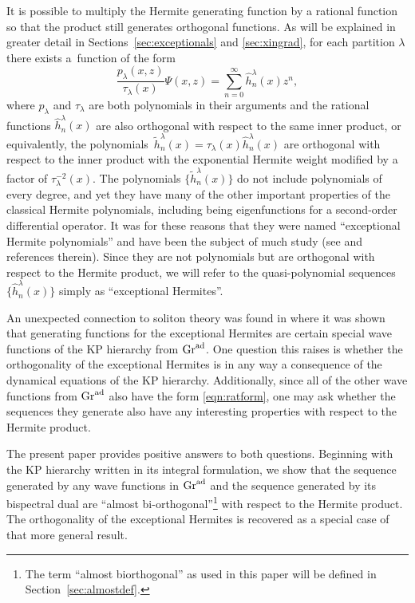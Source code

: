 \documentclass[pdftex]{sigma}
\numberwithin{equation}{section}
\theoremstyle{definition}
\begin{document}
 It is possible to multiply the Hermite generating function by a
 rational function so that the product still generates orthogonal functions.
As will be explained in greater detail in
Sections~\ref{sec:exceptionals} and \ref{sec:xingrad},
for each partition $\lambda$ there exists a~function of the form
 \begin{equation}
 \frac{p_{\lambda}(x,z)}{\tau_{\lambda}(x)}\Psi(x,z)=\sum_{n=0}^{\infty}\hat
 h_n^\lambda(x)z^n,\label{eqn:ratform}
\end{equation}
 where $p_{\lambda}$ and $\tau_{\lambda}$ are both polynomials in
 their arguments and the rational functions $\hat h_n^\lambda(x)$ are also
 orthogonal with respect to the same inner product, or equivalently, the polynomials~${\tilde h_n^\lambda(x)=\tau_{\lambda}(x)\hat h_n^{\lambda}(x)}$ are
 orthogonal with respect to the inner product with the exponential
 Hermite weight modified
 by a factor of $\tau_{\lambda}^{-2}(x)$.
The polynomials $\bigl\{\tilde h_n^\lambda(x)\bigr\}$ do not include
polynomials of every degree, and yet they have many of the other
important properties of the classical Hermite polynomials, including
being eigenfunctions for a second-order differential operator.
 It was
for these reasons that they were named ``exceptional Hermite
polynomials'' and have been the subject of much study (see
\cite{2014dry,XHermite1,XHermite2} and references therein). Since
they are not polynomials but are orthogonal with respect to the
Hermite product, we will refer to the quasi-polynomial sequences $\big\{\hat h_n^\lambda(x)\big\}$
simply as
``exceptional
 Hermites''.


An unexpected connection to soliton theory was found
in \cite{KasMil} where it was shown that generating functions
for the exceptional Hermites
are certain special wave functions of the KP hierarchy from ${\rm Gr}^{\rm ad}$.
One question this raises is whether the orthogonality of the
exceptional Hermites is in any way a consequence of the dynamical
equations of the KP hierarchy. Additionally, since all of the other
wave functions from ${\rm Gr}^{\rm ad}$ also have the form \eqref{eqn:ratform},
one may ask whether the sequences they generate also have any
interesting properties with respect to the Hermite product.

The present paper provides positive answers to both questions.
Beginning with the KP hierarchy written in its integral formulation,
we show that the sequence generated by any wave functions in
${\rm Gr}^{\rm ad}$ and the sequence generated by its bispectral dual are
``almost bi-orthogonal''\footnote{The term
 ``almost biorthogonal'' as used in this paper will be defined in Section~\ref{sec:almostdef}.}
with respect to the Hermite product. The orthogonality
of the exceptional Hermites is recovered as a special case of that
more general result.
\end{document}
